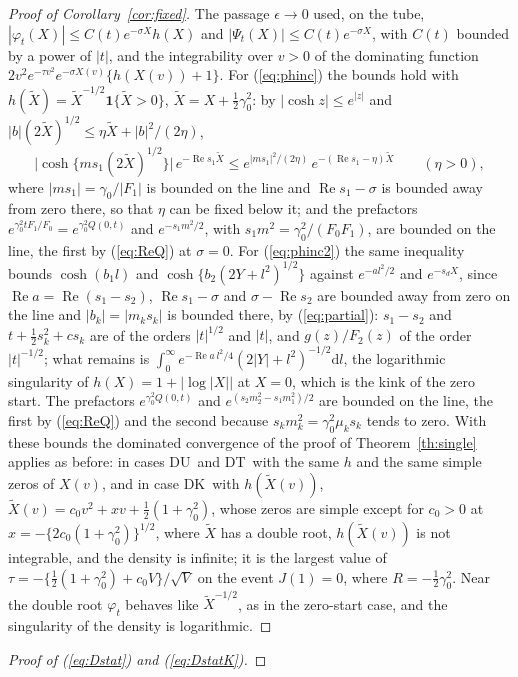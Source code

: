 \documentclass[ecta,nameyear,final]{econsocart}
\newcommand{\dr}[1]{{\mathrm d}#1}
\newcommand{\Rea}{\operatorname{Re}}
\newcommand{\Fk}{\textsf{\upshape DK}}
\newcommand{\Fu}{\textsf{\upshape DU}}
\newcommand{\Ft}{\textsf{\upshape DT}}
\theoremstyle{plain}
\theoremstyle{definition}
\begin{document}
\begin{appendix}
\begin{proof}[Proof of Corollary~\ref{cor:fixed}]
The passage $\epsilon\to0$ used, on the tube, $|\varphi_t(X)|\le C(t)e^{-\sigma X}h(X)$ and $|\Psi_t(X)|\le C(t)e^{-\sigma X}$, with $C(t)$ bounded by a power of $|t|$, and the integrability over $v>0$ of the dominating function $2v^2e^{-\tau v^2}e^{-\sigma X(v)}\{h(X(v))+1\}$.  For (\ref{eq:phinc}) the bounds hold with $h(\tilde X)=\tilde X^{-1/2}\mathbf{1}\{\tilde X>0\}$, $\tilde X=X+\frac12\gamma_0^2$: by $|\cosh z|\le e^{|z|}$ and $|b|(2\tilde X)^{1/2}\le\eta\tilde X+|b|^2/(2\eta)$,
\[
\big|\cosh\{ms_1(2\tilde X)^{1/2}\}\big|\,e^{-\Rea s_1\tilde X}\le e^{|ms_1|^2/(2\eta)}\,e^{-(\Rea s_1-\eta)\tilde X}\qquad(\eta>0),
\]
where $|ms_1|=\gamma_0/|F_1|$ is bounded on the line and $\Rea s_1-\sigma$ is bounded away from zero there, so that $\eta$ can be fixed below it; and the prefactors $e^{\gamma_0^2tF_1/F_0}=e^{\gamma_0^2Q(0,t)}$ and $e^{-s_1m^2/2}$, with $s_1m^2=\gamma_0^2/(F_0F_1)$, are bounded on the line, the first by (\ref{eq:ReQ}) at $\sigma=0$.  For (\ref{eq:phinc2}) the same inequality bounds $\cosh(b_1l)$ and $\cosh\{b_2(2Y+l^2)^{1/2}\}$ against $e^{-al^2/2}$ and $e^{-s_dX}$, since $\Rea a=\Rea(s_1-s_2)$, $\Rea s_1-\sigma$ and $\sigma-\Rea s_2$ are bounded away from zero on the line and $|b_k|=|m_ks_k|$ is bounded there, by (\ref{eq:partial}): $s_1-s_2$ and $t+\frac12s_k^2+cs_k$ are of the orders $|t|^{1/2}$ and $|t|$, and $g(z)/F_2(z)$ of the order $|t|^{-1/2}$; what remains is $\int_0^\infty e^{-\Rea a\,l^2/4}(2|Y|+l^2)^{-1/2}\dr{l}$, the logarithmic singularity of $h(X)=1+|\log|X||$ at $X=0$, which is the kink of the zero start.  The prefactors $e^{\gamma_0^2Q(0,t)}$ and $e^{(s_2m_2^2-s_1m_1^2)/2}$ are bounded on the line, the first by (\ref{eq:ReQ}) and the second because $s_km_k^2=\gamma_0^2\mu_ks_k$ tends to zero.  With these bounds the dominated convergence of the proof of Theorem~\ref{th:single} applies as before: in cases \Fu\ and \Ft\ with the same $h$ and the same simple zeros of $X(v)$, and in case \Fk\ with $h(\tilde X(v))$, $\tilde X(v)=c_0v^2+xv+\frac12(1+\gamma_0^2)$, whose zeros are simple except for $c_0>0$ at $x=-\{2c_0(1+\gamma_0^2)\}^{1/2}$, where $\tilde X$ has a double root, $h(\tilde X(v))$ is not integrable, and the density is infinite; it is the largest value of $\tau=-\{\frac12(1+\gamma_0^2)+c_0V\}/\sqrt V$ on the event $J(1)=0$, where $R=-\frac12\gamma_0^2$.  Near the double root $\varphi_t$ behaves like $\tilde X^{-1/2}$, as in the zero-start case, and the singularity of the density is logarithmic.
\end{proof}\begin{proof}[Proof of (\ref{eq:Dstat}) and (\ref{eq:DstatK})]

\end{proof}
\end{appendix}
\end{document}
